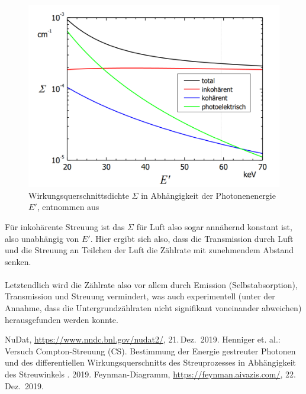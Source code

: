 \documentclass[german,  %
parskip=full,  %
]{scrartcl}
\begin{document}
\begin{figure}[h!]\centering
\includegraphics[scale=0.4]{sigma_luft}
\caption{Wirkungsquerschnittsdichte $\Sigma$ in Abhängigkeit der Photonenenergie $E'$, entnommen aus \cite{Anleitung}}
\end{figure}
\newpage
Für inkohärente Streuung ist das $\Sigma$ für Luft also sogar annähernd konstant ist, also unabhängig von $E'$.
Hier ergibt sich also, dass die Transmission durch Luft und die Streuung an Teilchen der Luft die Zählrate mit zunehmendem Abstand senken.
\\\\
Letztendlich wird die Zählrate also vor allem durch Emission (Selbstabsorption), Transmission und Streuung vermindert, was auch experimentell (unter der Annahme, dass die Untergrundzählraten nicht signifikant voneinander abweichen) herausgefunden werden konnte. 

\newpage


    \begin{thebibliography}{9}
    NuDat,
    \url{https://www.nndc.bnl.gov/nudat2/},
    21.\,Dez.~2019.
    Henniger et. al.: Versuch Compton-Streuung (CS). Bestimmung der Energie gestreuter Photonen und des differentiellen Wirkungsquerschnitts des Streuprozesses in Abhängigkeit des Streuwinkels . 2019.
    Feynman-Diagramm,
    \url{https://feynman.aivazis.com/},
    22.\,Dez.~2019.
\end{thebibliography}
\end{document}
